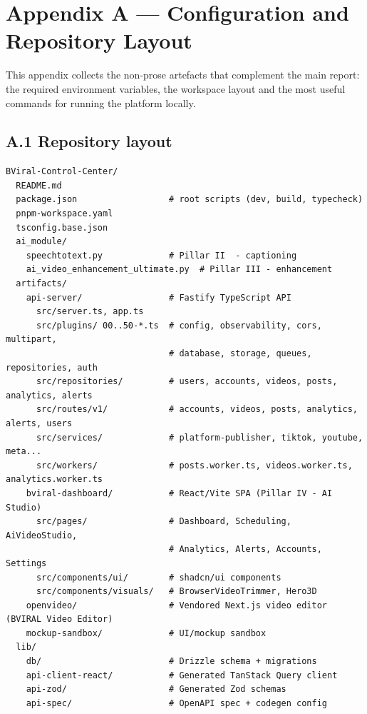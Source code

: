 \chapter{Appendix A --- Configuration and Repository Layout}
\label{ch:appendixA}

This appendix collects the non-prose artefacts that complement the main report: the
required environment variables, the workspace layout and the most useful commands for
running the platform locally.

\section*{A.1 Repository layout}

\begin{lstlisting}[caption={pnpm workspace layout (selected files)},label={lst:layout}]
BViral-Control-Center/
  README.md
  package.json                  # root scripts (dev, build, typecheck)
  pnpm-workspace.yaml
  tsconfig.base.json
  ai_module/
    speechtotext.py             # Pillar II  - captioning
    ai_video_enhancement_ultimate.py  # Pillar III - enhancement
  artifacts/
    api-server/                 # Fastify TypeScript API
      src/server.ts, app.ts
      src/plugins/ 00..50-*.ts  # config, observability, cors, multipart,
                                # database, storage, queues, repositories, auth
      src/repositories/         # users, accounts, videos, posts, analytics, alerts
      src/routes/v1/            # accounts, videos, posts, analytics, alerts, users
      src/services/             # platform-publisher, tiktok, youtube, meta...
      src/workers/              # posts.worker.ts, videos.worker.ts, analytics.worker.ts
    bviral-dashboard/           # React/Vite SPA (Pillar IV - AI Studio)
      src/pages/                # Dashboard, Scheduling, AiVideoStudio,
                                # Analytics, Alerts, Accounts, Settings
      src/components/ui/        # shadcn/ui components
      src/components/visuals/   # BrowserVideoTrimmer, Hero3D
    openvideo/                  # Vendored Next.js video editor (BVIRAL Video Editor)
    mockup-sandbox/             # UI/mockup sandbox
  lib/
    db/                         # Drizzle schema + migrations
    api-client-react/           # Generated TanStack Query client
    api-zod/                    # Generated Zod schemas
    api-spec/                   # OpenAPI spec + codegen config
\end{lstlisting}


